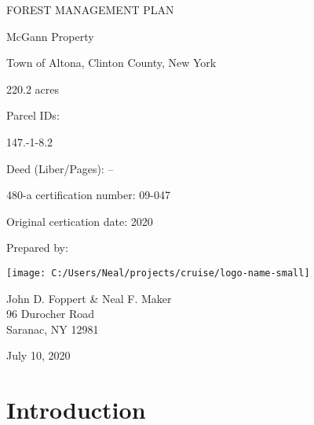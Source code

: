 \documentclass[]{tufte-handout}
\date{}
\begin{document}
 \vspace*{30pt}

\huge FOREST MANAGEMENT PLAN

\vspace{30pt}

\LARGE McGann Property

\vspace{22pt}

\normalsize Town of Altona, Clinton County, New York

\vspace{70pt}

\small 220.2 acres

\vspace{18pt}

Parcel IDs:

\vspace{8pt}

147.-1-8.2

\vspace{10pt}

Deed (Liber/Pages): --

\vspace{10pt}

480-a certification number: 09-047

\vspace{10pt}

Original certication date: 2020

\vspace{60pt}

Prepared by:

\texttt{[image: C:/Users/Neal/projects/cruise/logo-name-small]}

John D. Foppert \& Neal F. Maker\\
96 Durocher Road\\
Saranac, NY 12981

\vspace{30pt}

\large July 10, 2020

\pagebreak
{}

\section{Introduction}\label{introduction}
\end{document}

